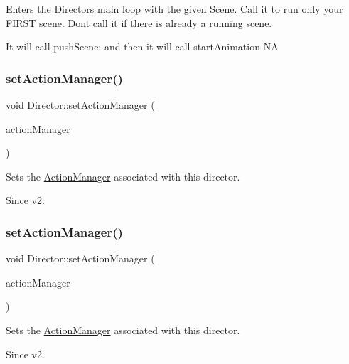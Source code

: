 Enters the \hyperlink{classDirector}{Director}\textquotesingle{}s main loop with the given \hyperlink{classScene}{Scene}. Call it to run only your F\+I\+R\+ST scene. Don\textquotesingle{}t call it if there is already a running scene.

It will call push\+Scene\+: and then it will call start\+Animation  NA \mbox{\label{classDirector_acf717de7917cf4ffd0a3e1c2b1965628}} 
\subsubsection{\texorpdfstring{set\+Action\+Manager()}{setActionManager()}\hspace{0.1cm}{\footnotesize\ttfamily [1/2]}}
{\footnotesize\ttfamily void Director\+::set\+Action\+Manager (\begin{DoxyParamCaption}\item[{\hyperlink{classActionManager}{Action\+Manager} $\ast$}]{action\+Manager }\end{DoxyParamCaption})}

Sets the \hyperlink{classActionManager}{Action\+Manager} associated with this director. \begin{DoxySince}{Since}
v2. 
\end{DoxySince}
\mbox{\label{classDirector_acf717de7917cf4ffd0a3e1c2b1965628}} 
\subsubsection{\texorpdfstring{set\+Action\+Manager()}{setActionManager()}\hspace{0.1cm}{\footnotesize\ttfamily [2/2]}}
{\footnotesize\ttfamily void Director\+::set\+Action\+Manager (\begin{DoxyParamCaption}\item[{\hyperlink{classActionManager}{Action\+Manager} $\ast$}]{action\+Manager }\end{DoxyParamCaption})}

Sets the \hyperlink{classActionManager}{Action\+Manager} associated with this director. \begin{DoxySince}{Since}
v2. 
\end{DoxySince}
\mbox{\label{classDirector_a405b60d715c4828cc4541dfc5c34c04f}} 

